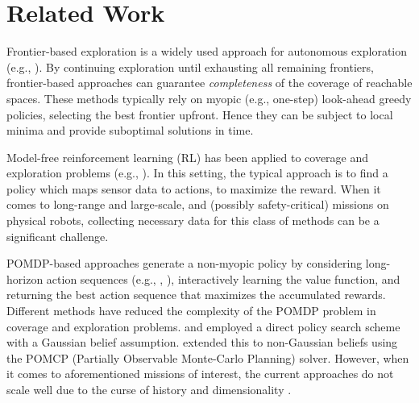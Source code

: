 \documentclass{article}
\newcommand{\ph}[1]{{\textbf{#1}:}} %
\begin{document}
\section{Related Work}\label{sec:related_work}
Frontier-based exploration is a widely used approach for autonomous exploration (e.g., \cite{yamauchi1997frontier,tao2007motion,keidar2012robot,heng2015efficient,gonzalez2002navigation,grabowski2003autonomous}). By continuing exploration until exhausting all remaining frontiers, frontier-based approaches can guarantee \textit{completeness} of the coverage of reachable spaces.  These methods typically rely on myopic (e.g., one-step) look-ahead greedy policies, selecting the best frontier upfront. Hence they can be subject to local minima and provide suboptimal solutions in time.

Model-free reinforcement learning (RL) has been applied to coverage and exploration problems (e.g., \cite{pathak_icm, rnd,burda2018study,ECR2018}). In this setting, the typical approach is to find a policy which maps sensor data to actions, to maximize the reward. When it comes to long-range and large-scale, and (possibly safety-critical) missions on physical robots, collecting necessary data for this class of methods can be a significant challenge.

POMDP-based approaches generate a non-myopic policy by considering long-horizon action sequences (e.g., \cite{kurniawati2011motion}, \cite{bai2015intention}), interactively learning the value function, and returning the best action sequence that maximizes the accumulated rewards. Different methods have reduced the complexity of the POMDP problem in coverage and exploration problems. \citet{indelman2015planning} and \citet{martinez2009bayesian} employed a direct policy search scheme with a Gaussian belief assumption. \citet{Lauri2016planning} extended this to non-Gaussian beliefs using the POMCP (Partially Observable Monte-Carlo Planning) solver. %
However, when it comes to aforementioned missions of interest, the current approaches do not scale well due to the curse of history and dimensionality \cite{Pineau03}.
\end{document}
